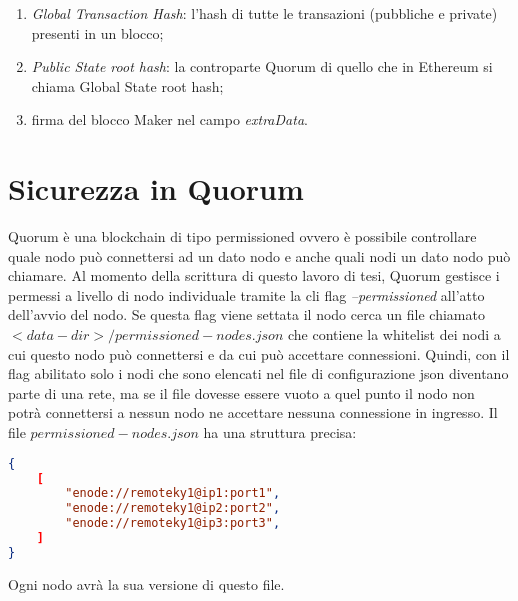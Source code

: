 \begin{enumerate}
	\item \emph{Global Transaction Hash}: l'hash di tutte le transazioni (pubbliche e private) presenti in un blocco;
	\item \emph{Public State root hash}: la controparte Quorum di quello che in Ethereum si chiama Global State root hash;
	\item firma del blocco Maker nel campo \emph{extraData}.
\end{enumerate}%
\section{Sicurezza in Quorum}%
Quorum è una blockchain di tipo permissioned ovvero è possibile controllare quale nodo può connettersi ad un dato nodo e anche quali nodi un dato nodo può chiamare. Al momento della scrittura di questo lavoro di tesi, Quorum gestisce i permessi a livello di nodo individuale tramite la cli flag \emph{--permissioned} all'atto dell'avvio del nodo. Se questa flag viene settata il nodo cerca un file chiamato $<data-dir>/permissioned-nodes.json$ che contiene la whitelist dei nodi a cui questo nodo può connettersi e da cui può accettare connessioni. Quindi, con il flag abilitato solo i nodi che sono elencati nel file di configurazione json diventano parte di una rete, ma se il file dovesse essere vuoto a quel punto il nodo non potrà connettersi a nessun nodo ne accettare nessuna connessione in ingresso. Il file $permissioned-nodes.json$ ha una struttura precisa:
\begin{lstlisting}[language=json, firstnumber = 1]
{
	[ 
		"enode://remoteky1@ip1:port1",
		"enode://remoteky1@ip2:port2",
		"enode://remoteky1@ip3:port3", 
	]
}
\end{lstlisting}%
Ogni nodo avrà la sua versione di questo file.%
